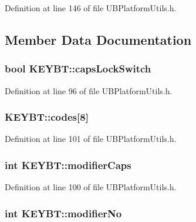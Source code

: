 Definition at line 146 of file U\-B\-Platform\-Utils.\-h.



\subsection{Member Data Documentation}
\hypertarget{struct_k_e_y_b_t_ab4ca415bd57f97a60915a2af06c75958}{
\subsubsection[{caps\-Lock\-Switch}]{\setlength{\rightskip}{0pt plus 5cm}bool K\-E\-Y\-B\-T\-::caps\-Lock\-Switch}}\label{d3/dd2/struct_k_e_y_b_t_ab4ca415bd57f97a60915a2af06c75958}


Definition at line 96 of file U\-B\-Platform\-Utils.\-h.

\hypertarget{struct_k_e_y_b_t_a198ae305b41a3b0a5a571a475f448c5d}{
\subsubsection[{codes}]{ K\-E\-Y\-B\-T\-::codes\mbox{[}8\mbox{]}}}\label{d3/dd2/struct_k_e_y_b_t_a198ae305b41a3b0a5a571a475f448c5d}


Definition at line 101 of file U\-B\-Platform\-Utils.\-h.

\hypertarget{struct_k_e_y_b_t_a84296145483528534a88d1baa1c09727}{
\subsubsection[{modifier\-Caps}]{\setlength{\rightskip}{0pt plus 5cm}int K\-E\-Y\-B\-T\-::modifier\-Caps}}\label{d3/dd2/struct_k_e_y_b_t_a84296145483528534a88d1baa1c09727}


Definition at line 100 of file U\-B\-Platform\-Utils.\-h.

\hypertarget{struct_k_e_y_b_t_aed3283c14d3f745f7e0a41b319c0781c}{
\subsubsection[{modifier\-No}]{\setlength{\rightskip}{0pt plus 5cm}int K\-E\-Y\-B\-T\-::modifier\-No}}\label{d3/dd2/struct_k_e_y_b_t_aed3283c14d3f745f7e0a41b319c0781c}


